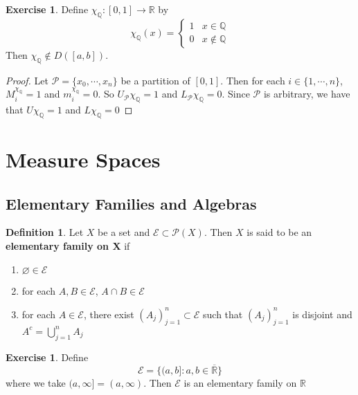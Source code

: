 \documentclass[12pt]{amsart}
\theoremstyle{definition}
\newtheorem{defn}[definition]{Definition}
\newtheorem{ex}[definition]{Exercise}
\newcommand{\R}{\mathbb{R}}
\newcommand{\Q}{\mathbb{Q}}
\newcommand{\MP}{\mathcal{P}}
\newcommand{\ME}{\mathcal{E}}
\newcommand{\lex}[1]{\label{ex:#1}}
\newcommand{\ld}[1]{\label{defn:#1}}
\begin{document}
	\begin{ex} \lex{00000} 
		Define $\chi_{\Q}:[0,1] \rightarrow \R$ by $$\chi_{\Q}(x) = \begin{cases}
			1 & x \in \Q \\
			0 & x \not \in \Q
		\end{cases}$$
		Then $\chi_\Q \not \in D([a,b])$.
	\end{ex}

	\begin{proof}
		Let $\MP = \{x_0, \cdots, x_n\}$ be a partition of $[0,1]$. Then for each $i \in \{1, \cdots, n\}$, $M^{\chi_{\Q}}_i = 1$ and $m^{\chi_{\Q}}_i = 0$. So $U_\MP \chi_\Q = 1$ and $L_\MP \chi_\Q = 0$. Since $\MP$ is arbitrary, we have that $U \chi_\Q = 1$ and $L \chi_\Q = 0$
	\end{proof}

	
	
	
	
	
	
	
	
	
	
	
	
	
	
	\newpage
	
	\section{Measure Spaces}
	
	
	\subsection{Elementary Families and Algebras}
	
	\begin{defn} \ld{00000} 
		Let $X$ be a set and $\ME \subset \MP(X)$. Then $X$ is said to be an \textbf{elementary family on X} if 
		\begin{enumerate}
			\item $\varnothing \in \ME$
			\item for each $A, B \in \ME$, $A \cap B \in \ME$
			\item for each $A \in \ME$, there exist $(A_j)_{j=1}^n \subset \ME$ such that  $(A_j)_{j=1}^n $ is disjoint and $A^c = \bigcup\limits_{j=1}^n A_j$
		\end{enumerate}
	\end{defn}
	
	\begin{ex} \lex{00000} 
		Define $$\ME = \{(a,b]: a,b \in \overline{\R}\}$$ where we take $(a, \infty] = (a, \infty)$. Then $\ME$ is an elementary family on $\R$
	\end{ex}
	
\end{document}
